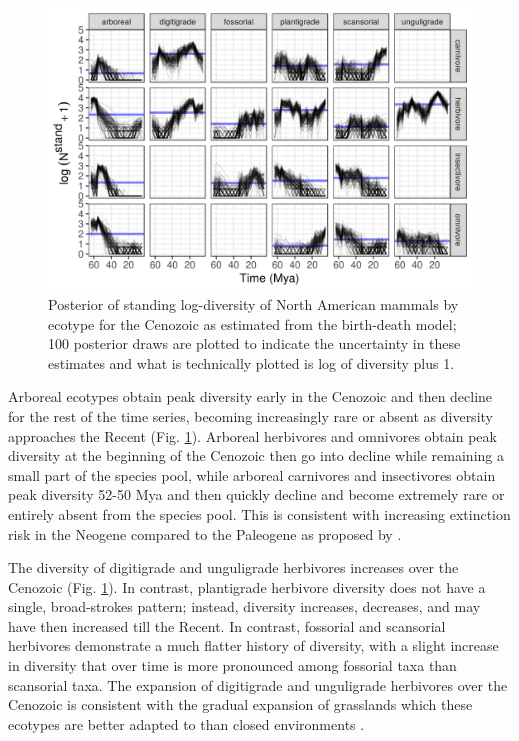 \documentclass[12pt,letterpaper]{article}
\begin{document}
\begin{figure}[ht]
  \centering
  \includegraphics[width=\textwidth,height=0.5\textheight,keepaspectratio=true]{figure/ecotype_diversity}
  \caption[Estimated mammal ecotype log-diversity for the Cenozoic]{Posterior of standing log-diversity of North American mammals by ecotype for the Cenozoic as estimated from the birth-death model; 100 posterior draws are plotted to indicate the uncertainty in these estimates and what is technically plotted is log of diversity plus 1.}
  \label{fig:ecotype_diversity}
\end{figure}

Arboreal ecotypes obtain peak diversity early in the Cenozoic and then decline for the rest of the time series, becoming increasingly rare or absent as diversity approaches the Recent (Fig. \ref{fig:ecotype_diversity}). Arboreal herbivores and omnivores obtain peak diversity at the beginning of the Cenozoic then go into decline while remaining a small part of the species pool, while arboreal carnivores and insectivores obtain peak diversity 52-50 Mya and then quickly decline and become extremely rare or entirely absent from the species pool. This is consistent with increasing extinction risk in the Neogene compared to the Paleogene as proposed by \citet{Smits2015b}.

The diversity of digitigrade and unguligrade herbivores increases over the Cenozoic (Fig. \ref{fig:ecotype_diversity}). In contrast, plantigrade herbivore diversity does not have a single, broad-strokes pattern; instead, diversity increases, decreases, and may have then increased till the Recent. In contrast, fossorial and scansorial herbivores demonstrate a much flatter history of diversity, with a slight increase in diversity that over time is more pronounced among fossorial taxa than scansorial taxa. The expansion of digitigrade and unguligrade herbivores over the Cenozoic is consistent with the gradual expansion of grasslands which these ecotypes are better adapted to than closed environments \citep{Blois2009,Stromberg2005}.
\end{document}
